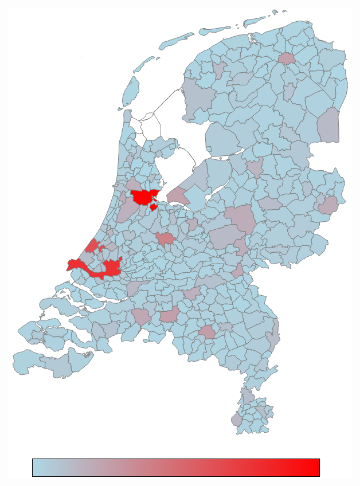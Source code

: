 \documentclass[a4paper,twoside,11pt]{article}
\begin{document}
\begin{figure}[h]
        \centering
        \begin{subfigure}[b]{0.12\textwidth}
                \includegraphics[width=\textwidth]{Heatmaps/HeatMap1.png}
                \caption{}
                \label{fig:numberOfInhabitants}
        \end{subfigure}%
        \begin{subfigure}[b]{0.12\textwidth}

\end{subfigure}
\end{figure}
\end{document}
